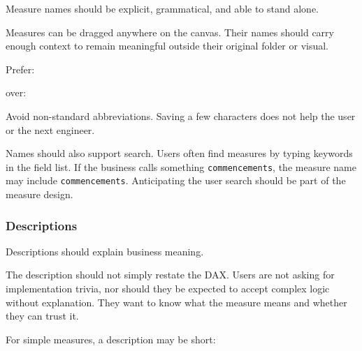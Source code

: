 \documentclass[10pt,openany,10pt]{book}
\begin{document}
Measure names should be explicit, grammatical, and able to stand alone.

Measures can be dragged anywhere on the canvas. Their names should carry
enough context to remain meaningful outside their original folder or
visual.

Prefer:

\begin{Shaded}
\begin{Highlighting}[]
\CommentTok{[}\CommentTok{]}
\end{Highlighting}
\end{Shaded}

over:

\begin{Shaded}
\begin{Highlighting}[]
\CommentTok{[}\CommentTok{]}
\end{Highlighting}
\end{Shaded}

Avoid non-standard abbreviations. Saving a few characters does not help
the user or the next engineer.

Names should also support search. Users often find measures by typing
keywords in the field list. If the business calls something
\texttt{commencements}, the measure name may include
\texttt{commencements}. Anticipating the user search should be part of
the measure design.

\subsubsection{Descriptions}\label{descriptions}

Descriptions should explain business meaning.

The description should not simply restate the DAX. Users are not asking
for implementation trivia, nor should they be expected to accept complex
logic without explanation. They want to know what the measure means and
whether they can trust it.

For simple measures, a description may be short:

\begin{Shaded}
\begin{Highlighting}[]
\end{Highlighting}
\end{Shaded}
\end{document}
